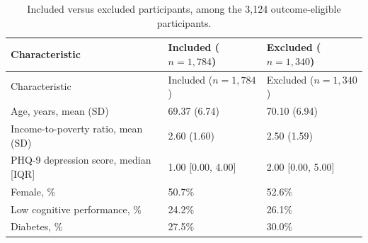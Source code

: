 \documentclass[12pt]{article}
\title{}
\date{}
\begin{document}
\pagestyle{empty}
\setcounter{table}{1}

\begin{longtable}{p{6.0cm}R{3.5cm}R{3.5cm}}
\caption{Included versus excluded participants, among the 3,124 outcome-eligible participants.}
\label{tab:t1b}\\
\toprule
Characteristic & Included ($n=1{,}784$) & Excluded ($n=1{,}340$) \\
\midrule
\endfirsthead
\toprule
Characteristic & Included ($n=1{,}784$) & Excluded ($n=1{,}340$) \\
\midrule
\endhead
\bottomrule
\endlastfoot
Age, years, mean (SD) & 69.37 (6.74) & 70.10 (6.94) \\
Income-to-poverty ratio, mean (SD) & 2.60 (1.60) & 2.50 (1.59) \\
PHQ-9 depression score, median [IQR] & 1.00 [0.00, 4.00] & 2.00 [0.00, 5.00] \\
Female, \% & 50.7\% & 52.6\% \\
Low cognitive performance, \% & 24.2\% & 26.1\% \\
Diabetes, \% & 27.5\% & 30.0\% \\
\end{longtable}
\end{document}
